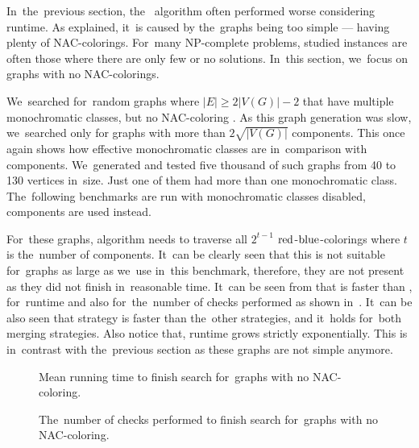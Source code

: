 In~the~previous section, the~\Subgraphs{} algorithm
often performed worse considering runtime.
As explained, it~is caused by the~graphs being too simple
--- having plenty of NAC-colorings.
%
For~many NP-complete problems, studied instances are often
those where there are only few or no solutions.
In~this section, we~focus on graphs with no NAC-colorings.

We~searched for~random graphs where \( |E| \ge 2|V(G)| - 2 \) that have
multiple monochromatic classes, but no NAC-coloring%
.
%
As this graph generation was slow, we~searched only for
graphs with more than \( 2\sqrt{|V(G)|} \) \trcon{} components.
%
This once again shows how effective monochromatic classes are
in~comparison with \trcon{} components.
We~generated and tested five thousand of such graphs from 40 to 130 vertices in~size.
Just one of them had more than one monochromatic class.
%
The~following benchmarks are run with monochromatic classes disabled,
\trcon{} components are used instead.

For~these graphs, \NaiveCycles{} algorithm needs to traverse all \( 2^{t-1} \) \(\text{red}\)-\(\text{blue}\)-colorings
where \( t \) is the~number of \trcon{} components. It~can be clearly seen that
this is not suitable for~graphs as large as we~use in~this benchmark,
therefore, they are not present as they did not finish in~reasonable time.
It~can be seen from 
that \SharedVertices{} is faster than \MergeLinear{},
for~runtime and also for~the~number of checks performed
as shown in~.
%
It~can be also seen that \NeighborsDegree{} strategy is
faster than the~other strategies, and it~holds for~both merging strategies.
Also notice that,
runtime grows strictly exponentially.
This is in~contrast with the~previous section
as these graphs are not simple anymore.

\begin{figure}[thbp]
	\centering
	\scalebox{\BenchFigureScale}{}
	\caption[Mean runtime for~graphs with no NAC-coloring]{
		Mean running time to finish search for~graphs with no NAC-coloring.}%
	\label{fig:graph_no_nac_coloring_first_runtime}
\end{figure}%
\begin{figure}[thbp]
	\centering
	\scalebox{\BenchFigureScale}{}
	\caption[Checks performed for~graphs with no NAC-coloring]{
		The~number of checks performed to finish search for~graphs with no NAC-coloring.}%
	\label{fig:graph_no_nac_coloring_first_checks}
\end{figure}%

